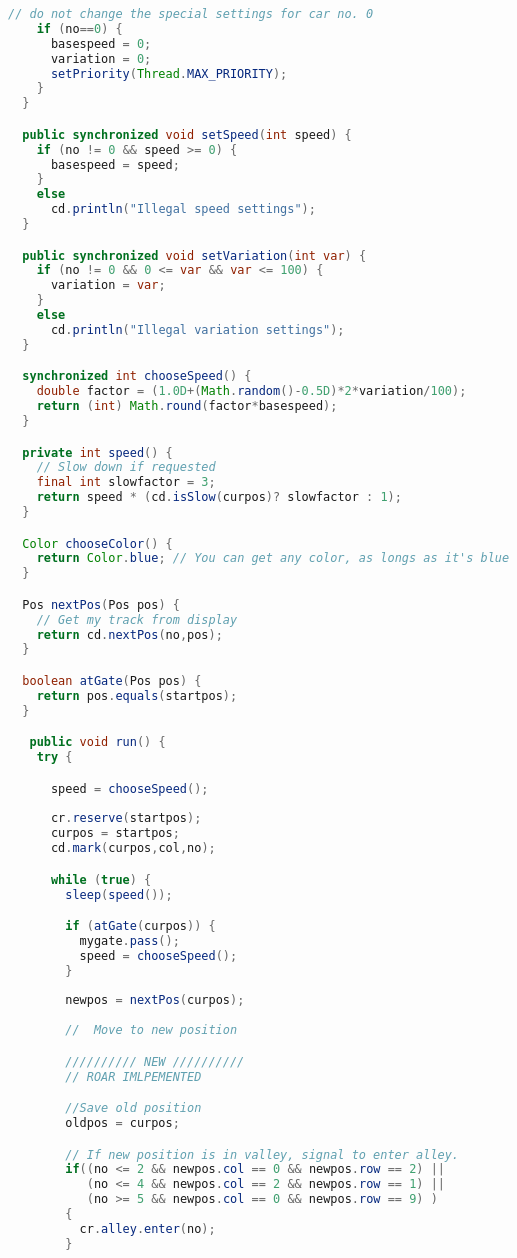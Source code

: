 \begin{lstlisting}[language=java]
    // do not change the special settings for car no. 0
    if (no==0) {
      basespeed = 0;  
      variation = 0; 
      setPriority(Thread.MAX_PRIORITY); 
    }
  }

  public synchronized void setSpeed(int speed) { 
    if (no != 0 && speed >= 0) {
      basespeed = speed;
    }
    else
      cd.println("Illegal speed settings");
  }

  public synchronized void setVariation(int var) { 
    if (no != 0 && 0 <= var && var <= 100) {
      variation = var;
    }
    else
      cd.println("Illegal variation settings");
  }

  synchronized int chooseSpeed() { 
    double factor = (1.0D+(Math.random()-0.5D)*2*variation/100);
    return (int) Math.round(factor*basespeed);
  }

  private int speed() {
    // Slow down if requested
    final int slowfactor = 3;  
    return speed * (cd.isSlow(curpos)? slowfactor : 1);
  }

  Color chooseColor() { 
    return Color.blue; // You can get any color, as longs as it's blue 
  }

  Pos nextPos(Pos pos) {
    // Get my track from display
    return cd.nextPos(no,pos);
  }

  boolean atGate(Pos pos) {
    return pos.equals(startpos);
  }

   public void run() {
    try {

      speed = chooseSpeed();
      
      cr.reserve(startpos);
      curpos = startpos;
      cd.mark(curpos,col,no);

      while (true) { 
        sleep(speed());

        if (atGate(curpos)) { 
          mygate.pass(); 
          speed = chooseSpeed();
        }
        	
        newpos = nextPos(curpos);
        
        //  Move to new position 

        ////////// NEW //////////
        // ROAR IMLPEMENTED

        //Save old position
        oldpos = curpos;

        // If new position is in valley, signal to enter alley.
        if((no <= 2 && newpos.col == 0 && newpos.row == 2) ||
           (no <= 4 && newpos.col == 2 && newpos.row == 1) ||
           (no >= 5 && newpos.col == 0 && newpos.row == 9) )
        {
          cr.alley.enter(no);
        }


\end{lstlisting}
